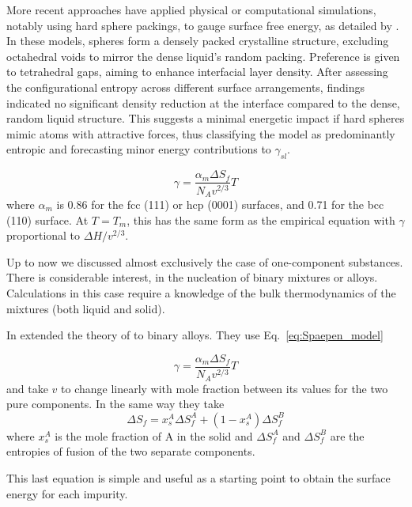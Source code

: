 More recent approaches have applied physical or computational simulations, notably using hard sphere packings, to gauge surface free energy, 
as detailed by \cite{Spaepen1975ASM}. In these models, spheres form a densely packed crystalline structure, excluding octahedral voids 
to mirror the dense liquid's random packing. Preference is given to tetrahedral gaps, aiming to enhance interfacial layer density. After 
assessing the configurational entropy across different surface arrangements, findings indicated no significant density reduction at the 
interface compared to the dense, random liquid structure. This suggests a minimal energetic impact if hard spheres mimic atoms with attractive forces, 
thus classifying the model as predominantly entropic and forecasting minor energy contributions to $\gamma_{sl}$.

\begin{equation} \label{eq:Spaepen_model}
\gamma = \frac{\alpha_m \Delta S_f}{N_{A} v^{2/3}} T
\end{equation}
where $\alpha_m$ is 0.86 for the fcc (111) or hcp (0001) surfaces, and 0.71 for the bcc (110) surface. At $T = T_m$, this has the same form as 
the empirical equation with $\gamma$ proportional to $\Delta H/v^{2/3}$.

Up to now we discussed almost exclusively the case of one-component substances. There is considerable interest, 
in the nucleation of binary mixtures or alloys. Calculations in this case 
require a knowledge of the bulk thermodynamics of the mixtures (both liquid and solid).

In \cite{Thompson1983HomogeneousCN} extended the theory of \cite{Spaepen1975ASM} to binary alloys. They use Eq.~\ref{eq:Spaepen_model}

\begin{equation} \label{eq:Thompson_Spaepen_model}
\gamma = \frac{\alpha_m \Delta S_f}{N_{A} v^{2/3}} T
\end{equation}
and take $v$ to change linearly with mole fraction between its values for the two pure components. In the same way they take
\begin{equation} \label{eq:Delta_S}
\Delta S_f = x_s^A \Delta S_f^A + (1 - x_s^A) \Delta S_f^B
\end{equation}
where $x_s^A$ is the mole fraction of A in the solid and $\Delta S_f^A$ and $\Delta S_f^B$ are the entropies of fusion of the two separate components.

This last equation is simple and useful as a starting point to obtain the surface energy for each impurity.


